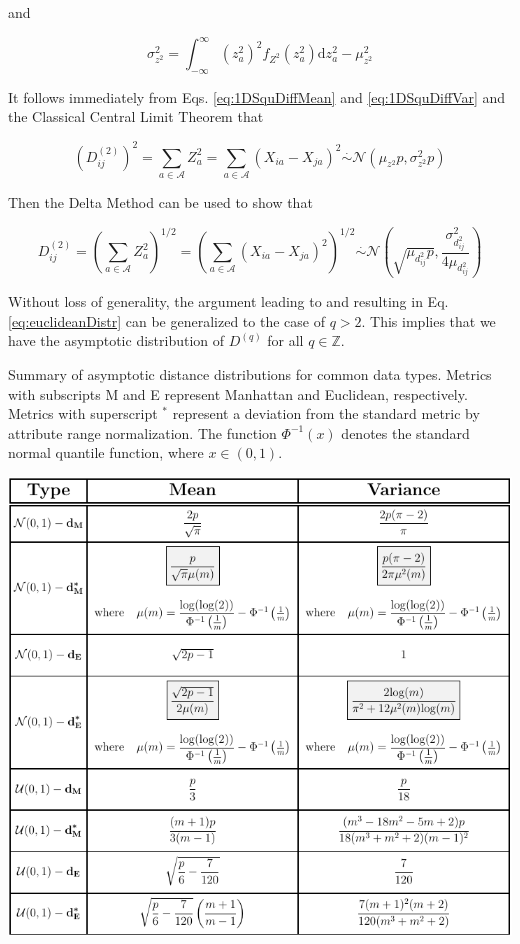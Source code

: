 \documentclass[10pt,letterpaper]{article}\usepackage[]{graphicx}\usepackage[]{color}
\begin{document}
and

\begin{equation}\label{eq:1DSquDiffVar}
\sigma^2_{z^2} = \int_{-\infty}^{\infty} (z^2_a)^2 f_{Z^2}(z^2_a) \text{d}z^2_a - \mu^2_{z^2}
\end{equation}

It follows immediately from Eqs. \ref{eq:1DSquDiffMean} and \ref{eq:1DSquDiffVar} and the Classical Central Limit Theorem that

\begin{equation}\label{eq:SquDiffDistr}
\left(D^{(2)}_{ij}\right)^2 = \sum_{a \in \mathcal{A}} Z^2_a = \sum_{a \in \mathcal{A}} (X_{ia} - X_{ja})^2 \overset{.}{\sim} \mathcal{N}\left(\mu_{z^2}p,\sigma^2_{z^2}p\right)
\end{equation}

Then the Delta Method \cite{allStats} can be used to show that

\begin{equation}\label{eq:euclideanDistr}
D^{(2)}_{ij} = \left(\sum_{a \in \mathcal{A}} Z^2_a\right)^{1/2} = \left(\sum_{a \in \mathcal{A}} (X_{ia} - X_{ja})^2\right)^{1/2} \overset{.}{\sim} \mathcal{N}\left(\sqrt{\mu_{d^2_{ij}}p},\frac{\sigma^2_{d^2_{ij}}}{4\mu_{d^2_{ij}}}\right)
\end{equation}

Without loss of generality, the argument leading to and resulting in Eq. \ref{eq:euclideanDistr} can be generalized to the case of $q>2$. This implies that we have the asymptotic distribution of $D^{(q)}$ for all $q \in \mathbb{Z}$.

\begin{table}[H]
\caption{Summary of asymptotic distance distributions for common data types. Metrics with subscripts M and E represent Manhattan and Euclidean, respectively. Metrics with superscript $^*$ represent a deviation from the standard metric by attribute range normalization. The function $\Phi^{-1}(x)$ denotes the standard normal quantile function, where $x \in (0,1)$.}
\label{tab:dist_distr_common}
\centering
\includegraphics[width=\textwidth]{typical_data-metric_tab.pdf}
\end{table}
\end{document}
